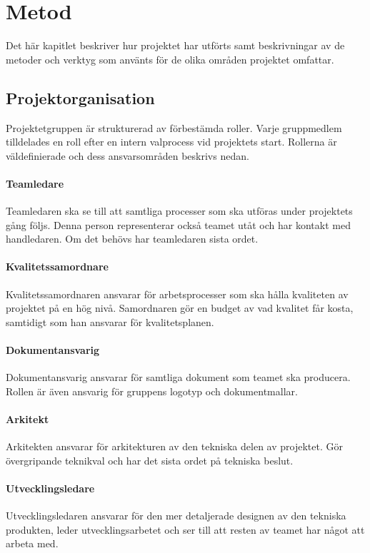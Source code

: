 \chapter{Metod}
\label{cha:method}
Det här kapitlet beskriver hur projektet har utförts samt beskrivningar av de metoder och verktyg som använts för de olika områden projektet omfattar.

\section{Projektorganisation}
Projektetgruppen är strukturerad av förbestämda roller. Varje gruppmedlem tilldelades en roll efter en intern valprocess vid projektets start. Rollerna är väldefinierade och dess ansvarsområden beskrivs nedan.

\subsubsection*{Teamledare}
Teamledaren ska se till att samtliga processer som ska utföras under projektets gång följs. Denna person representerar också teamet utåt och har kontakt med handledaren. Om det behövs har teamledaren sista ordet.

\subsubsection*{Kvalitetssamordnare}
Kvalitetssamordnaren ansvarar för arbetsprocesser som ska hålla kvaliteten av projektet på en hög nivå. Samordnaren gör en budget av vad kvalitet får kosta, samtidigt som han ansvarar för kvalitetsplanen.

\subsubsection*{Dokumentansvarig}
Dokumentansvarig ansvarar för samtliga dokument som teamet ska producera. Rollen är även ansvarig för gruppens logotyp och dokumentmallar.

\subsubsection*{Arkitekt}
Arkitekten ansvarar för arkitekturen av den tekniska delen av projektet. Gör övergripande teknikval och har det sista ordet på tekniska beslut.

\subsubsection*{Utvecklingsledare}
Utvecklingsledaren ansvarar för den mer detaljerade designen av den tekniska produkten, leder utvecklingsarbetet och ser till att resten av teamet har något att arbeta med.


